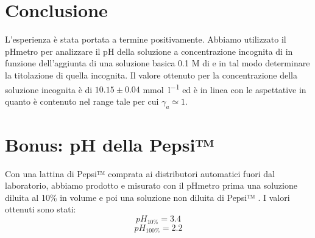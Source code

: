 \section*{Conclusione}

L'esperienza è stata portata a termine positivamente.
Abbiamo utilizzato il pHmetro per analizzare il pH della soluzione a concentrazione incognita di  in funzione dell'aggiunta di una soluzione basica 0.1 M di  e in tal modo determinare la titolazione di quella incognita.
Il valore ottenuto per la concentrazione della soluzione incognita è di $10.15 \pm 0.04$ \si{\milli\mol\per\litre} ed è in linea con le aspettative in quanto è contenuto nel range tale per cui $\gamma_{a} \simeq 1$.

\section*{Bonus: pH della Pepsi™}

Con una lattina di Pepsi™ comprata ai distributori automatici fuori dal laboratorio, abbiamo prodotto e misurato con il pHmetro prima una soluzione diluita al 10\% in volume e poi una soluzione non diluita di Pepsi™ .
I valori ottenuti sono stati:
$$pH_{10\%} = 3.4$$
$$pH_{100\%} = 2.2$$
